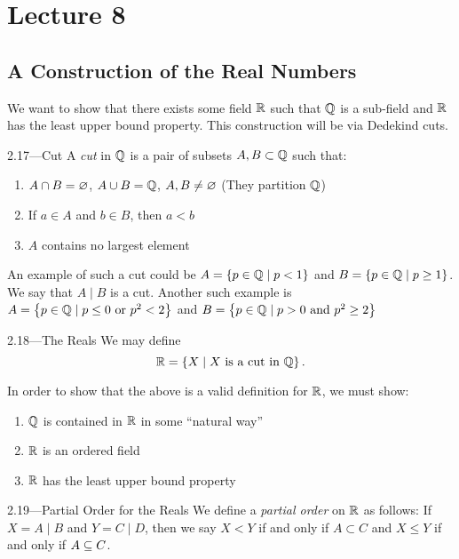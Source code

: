 \documentclass[class=article, crop=false]{standalone}
\begin{document}
  \section{Lecture 8}
  \subsection{A Construction of the Real Numbers}
  We want to show that there exists some field $\mathbb{R}$ such that $\mathbb{Q}$ is a sub-field and $\mathbb{R}$ has the least upper bound property. This construction will be via Dedekind cuts.
  \begin{definition}{2.17---Cut}
    A \emph{cut} in $\mathbb{Q}$ is a pair of subsets $A, B\subset \mathbb{Q}$ such that:
    \begin{enumerate}[label=(\roman*)]
      \item $A\cap B = \varnothing$, $A\cup B = \mathbb{Q}$, $A, B\neq \varnothing$ (They partition $\mathbb{Q}$)
      \item If $a\in A$ and $b\in B$, then $a < b$
      \item $A$ contains no largest element
    \end{enumerate}
  \end{definition}
  \begin{example}{}
    An example of such a cut could be $A = \left\{p\in\mathbb{Q}\mid p < 1\right\}$ and $B = \left\{p\in\mathbb{Q}\mid p\geq 1\right\}$. We say that $A\mid B$ is a cut. Another such example is $A = \left\{p\in\mathbb{Q}\mid p\leq 0 \text{ or } p^2 < 2\right\}$ and $B = \left\{p\in\mathbb{Q}\mid p > 0 \text{ and }p^2\geq 2\right\}$
  \end{example}
  \begin{definition}{2.18---The Reals}
    We may define
    \[
      \mathbb{R} = \left\{X\mid X \text{ is a cut in }\mathbb{Q}\right\}.
    \]
  \end{definition}
  In order to show that the above is a valid definition for $\mathbb{R}$, we must show:
  \begin{enumerate}[label=(\roman*)]
    \item $\mathbb{Q}$ is contained in $\mathbb{R}$ in some ``natural way''
    \item $\mathbb{R}$ is an ordered field
    \item $\mathbb{R}$ has the least upper bound property
  \end{enumerate}
  \begin{definition}{2.19---Partial Order for the Reals}
    We define a \emph{partial order} on $\mathbb{R}$ as follows:
    If $X = A\mid B$ and $Y = C\mid D$, then we say $X < Y$ if and only if $A\subset C$ and $X\leq Y$ if and only if $A\subseteq C$.
  \end{definition}
\end{document}
